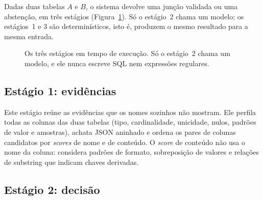 Dadas duas tabelas $A$ e $B$, o sistema devolve uma junção validada ou uma
abstenção, em três estágios (Figura~\ref{fig:pipeline}). Só o estágio~2 chama
um modelo; os estágios~1 e 3 são determinísticos, isto é, produzem o mesmo
resultado para a mesma entrada.

\begin{figure}[htbp]
\centering
{}
\caption{Os três estágios em tempo de execução. Só o estágio~2 chama um
modelo, e ele nunca escreve SQL nem expressões regulares.}
\label{fig:pipeline}
\end{figure}

\subsection{Estágio 1: evidências}

Este estágio reúne as evidências que os nomes sozinhos não mostram. Ele
perfila todas as colunas das duas tabelas (tipo, cardinalidade, unicidade,
nulos, padrões de valor e amostras), achata JSON aninhado e ordena os pares
de colunas candidatos por \emph{scores} de nome e de conteúdo. O \emph{score}
de conteúdo não usa o nome da coluna: considera padrões de formato,
sobreposição de valores e relações de substring que indicam chaves
derivadas.

\subsection{Estágio 2: decisão}

